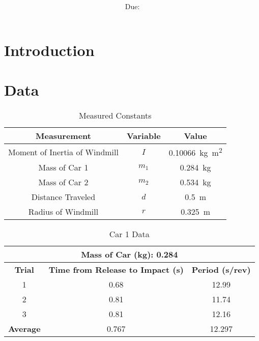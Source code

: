 \documentclass[article, 12pt]{article}
\title{
    \vspace{2in}
    \textmd{\textbf{\labTitle}}
    \normalsize\vspace{0.1in}\\
    \vspace{0.1in}\large{\text{\class: \professor}}
    \vspace{3in}
}
\author{\name}
\date{Due: \dueDate}
\begin{document}
    \maketitle
    \thispagestyle{empty}
    \pagebreak
    \section{Introduction}
    \section{Data}
        \begin{table}[H]
            \centering
            \begin{tabular}{|c|c|c|}
                \hline
                \textbf{Measurement} & \textbf{Variable} & \textbf{Value} \\
                \hline
                Moment of Inertia of Windmill & $I$ & \SI{0.10066}{\kilogram\meter^2} \\
                Mass of Car 1 & $m_1$ & \SI{0.284}{\kilogram} \\
                Mass of Car 2 & $m_2$ & \SI{0.534}{\kilogram} \\
                Distance Traveled & $d$ & \SI{0.5}{\meter} \\
                Radius of Windmill & $r$ & \SI{0.325}{\meter} \\
                \hline
            \end{tabular}
            \caption{Measured Constants}
            \label{tab:constants}
        \end{table}
        \begin{table}[H]
            \centering
            \begin{tabular}{|c|c|c|}
                \hline
                \multicolumn{3}{|c|}{\textbf{Mass of Car (kg): 0.284}} \\
                \hline
                \textbf{Trial} & \textbf{Time from Release to Impact (s)} & \textbf{Period (s/rev)} \\
                \hline
                1 & 0.68 & 12.99 \\
                2 & 0.81 & 11.74 \\
                3 & 0.81 & 12.16 \\
                \hline
                \textbf{Average} & 0.767 & 12.297 \\
                \hline
            \end{tabular}
            \caption{Car 1 Data}
            \label{tab:car1} 
        \end{table}
\end{document}
